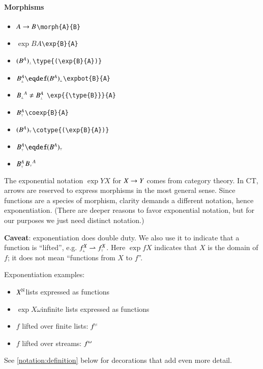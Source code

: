 \paragraph{Morphisms}

\begin{itemize}
\item \(A\rightarrow{}B\)\hfill \verb|\morph{A}{B}|
\item \(\exp{B}{A}\)\hfill \verb|\exp{B}{A}|
\item \((B^{A})_{\scriptscriptstyle\bot}\)\hfill\verb|\type{(\exp{B}{A})}|
\item \(\expbot{B}{A}\eqdef\type{(\exp{B}{A})}\)\hfill \verb|\expbot{B}{A}|
\item \({B_{\scriptscriptstyle\bot}}^{A}\neq B_{\scriptscriptstyle\bot}^{A}\) \hfill \verb|\exp{{\type{B}}}{A}|
\item \(B_{\scriptscriptstyle\top}^{A}\)\hfill \verb|\coexp{B}{A}|
\item \((B^{A})_{\scriptscriptstyle\top}\)\hfill\verb|\cotype{(\exp{B}{A})}|
\item \(\coexp{B}{A}\eqdef\ttop{(\exp{B}{A})}\)
\item \(B_{\scriptscriptstyle\top}^{A}\)\neq\({B_{\scriptscriptstyle\top}}^{A}\)
\end{itemize}

The exponential notation \(\exp{Y}{X}\) for \(X\rightarrow{}Y\) comes from
category theory. In CT, arrows are reserved to express morphisms in
the most general sense. Since functions are a species of morphism,
clarity demands a different notation, hence exponentiation. (There are
deeper reasons to favor exponential notation, but for our purposes we
just need distinct notation.)

\textbf{Caveat}: exponentiation does double duty. We also use it to
indicate that a function is ``lifted'', e.g.
\(f_{\scriptscriptstyle\bot}^{X}\rightharpoonup{}f_{\scriptscriptstyle\top}^{X}\). Here \(\exp{f}{X}\)
indicates that \(X\) is the domain of \(f\); it does not mean
``functions from \(X\) to \(f\)''.

Exponentiation examples:
\begin{itemize}
\item \(X^{\mathbb{N}}\)\quad lists expressed as functions
\item \(\exp{X}{\omega}\)\quad infinite lists expressed as functions
\item \(f\) lifted over finite lists: \(f^{\scriptscriptstyle\mathbb{N}}\)
\item \(f\) lifted over streams: \(f^{\omega}\)
\end{itemize}

See \ref{notation:definition} below for decorations that add even more
detail.



